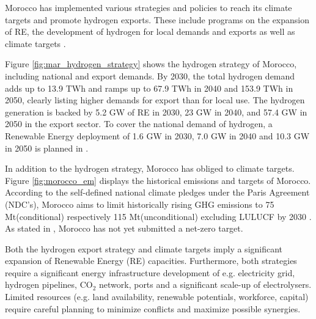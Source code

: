 Morocco has implemented various strategies and policies to reach its climate targets and promote hydrogen exports. These include programs on the expansion of RE, the development of hydrogen for local demands and exports as well as climate targets \cite{MarHyStrat2021, CAT2021}.


Figure \ref{fig:mar_hydrogen_strategy} shows the hydrogen strategy of Morocco, including national and export demands.
By 2030, the total hydrogen demand adds up to 13.9 TWh and ramps up to 67.9 TWh in 2040 and 153.9 TWh in 2050, 
clearly listing higher demands for export than for local use. The hydrogen generation is backed by 5.2 GW of RE in 2030, 23 GW in 2040, and 57.4 GW in 2050 in the export sector. To cover the national demand of hydrogen, a Renewable Energy deployment of 1.6 GW in 2030, 7.0 GW in 2040 and 10.3 GW in 2050 is planned in \cite{MarHyStrat2021}.


In addition to the hydrogen strategy, Morocco has obliged to climate targets. Figure \ref{fig:morocco_em} displays the historical emissions and targets of Morocco.
According to the self-defined national climate pledges under the Paris Agreement (NDC's), Morocco aims to limit historically rising GHG emissions to 75 Mt\coe (conditional) respectively 115 Mt\coe (unconditional) excluding LULUCF by 2030 \cite{CAT2021}. 
As stated in \cite{CAT2021}, Morocco has not yet submitted a net-zero target. 

Both the hydrogen export strategy and climate targets imply a significant expansion of Renewable Energy (RE) capacities. Furthermore, both strategies require a significant energy infrastructure development of e.g. electricity grid, hydrogen pipelines, $\mathrm{CO_2}$ network, ports and a significant scale-up of electrolysers.
Limited resources (e.g. land availability, renewable potentials, workforce, capital) require careful planning to minimize conflicts and maximize possible synergies.

